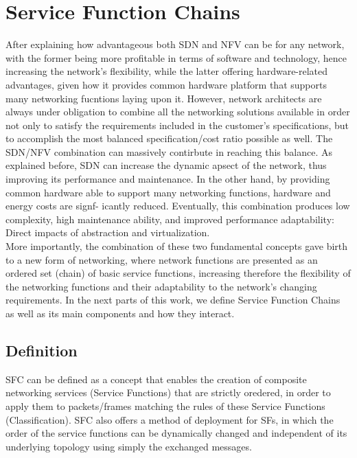 \section{Service Function Chains \cite{nano3}}
After explaining how advantageous both SDN and NFV can be for any network, with the former being more profitable in terms of software and technology, hence increasing the network’s flexibility, while the latter offering hardware-related advantages, given how it provides common hardware
platform that supports many networking fucntions laying upon it. However, network architects are always under obligation to combine all the networking solutions available in order not only to satisfy the requirements included in the customer’s specifications, but to accomplish the most balanced specification/cost ratio possible as well. The SDN/NFV combination can massively contirbute in reaching this balance. As explained before, SDN can increase the dynamic apsect of the network, thus improving its performance and maintenance. In the other hand, by providing common hardware able to support many networking functions, hardware and energy costs are signf-
icantly reduced. Eventually, this combination produces low complexity, high maintenance ability, and improved performance adaptability: Direct impacts of abstraction and virtualization.\\
More importantly, the combination of these two fundamental concepts gave birth to a new form of networking, where network functions are presented as an ordered set (chain) of basic service functions, increasing therefore the flexibility of the networking functions and their adaptability to the network’s changing requirements. In the next parts of this work, we define Service Function Chains as well as its main components and how they interact.
\subsection{Definition}
SFC can be defined as a concept that enables the creation of composite networking services (Service Functions) that are strictly oredered, in order to apply them to packets/frames matching the rules of these Service Functions
(Classification). SFC also offers a method of deployment for SFs, in which the order of the service functions can be dynamically changed and independent of its underlying topology using simply the exchanged messages.
